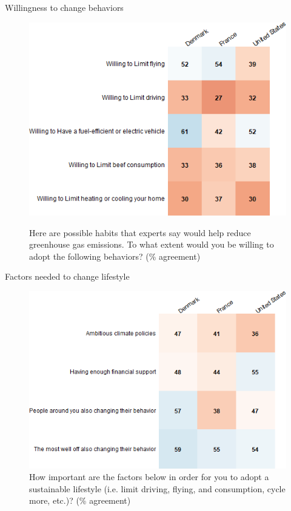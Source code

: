 \documentclass[aspectratio=169,9pt,dvipsnames]{beamer}
\begin{document}
\begin{frame}{Willingness to change behaviors}%
\begin{figure}[h!]
\centering
\caption{Here are possible habits that experts say would help reduce greenhouse gas emissions.
To what extent would you be willing to adopt the following behaviors? (\% agreement)}
\includegraphics[width=.6\textwidth]{../figures/country_comparison/willing_positive_countries.png} \\
\end{figure}
\end{frame}

\begin{frame}{Factors needed to change lifestyle}%
\begin{figure}[h!]
\centering
\caption{How important are the factors below in order for you to adopt a sustainable lifestyle (i.e. limit driving, flying, and consumption, cycle more, etc.)? (\% agreement)}
\includegraphics[width=.6\textwidth]{../figures/country_comparison/condition_positive_countries.png}
\end{figure}
\end{frame}

\end{document}
